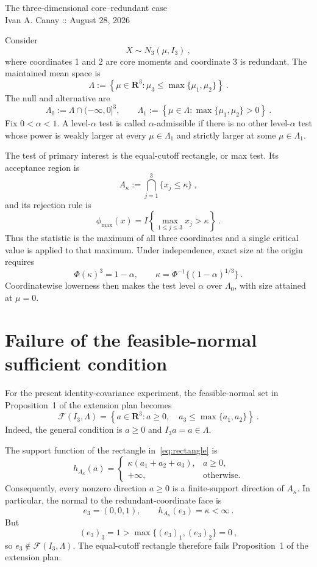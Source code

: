 \documentclass[12pt]{article}
\theoremstyle{remark}
\begin{document}
\begin{center}
{\Large The three-dimensional core--redundant case}\\[3pt]
{\small Ivan A. Canay :: August 28, 2026}
\end{center}

\medskip

Consider
\[
X\sim N_3(\mu,I_3)~,
\]
where coordinates 1 and 2 are core moments and coordinate 3 is redundant.  The
maintained mean space is
\[
\Lambda
:=
\left\{\mu\in\mathbf R^3:
\mu_3\le\max\{\mu_1,\mu_2\}
\right\}~.
\]
The null and alternative are
\[
\Lambda_0:=\Lambda\cap(-\infty,0]^3,
\qquad
\Lambda_1
:=
\left\{\mu\in\Lambda:
\max\{\mu_1,\mu_2\}>0
\right\}~.
\]
Fix $0<\alpha<1$.
A level-$\alpha$ test is called $\alpha$-admissible if there is no other
level-$\alpha$ test whose power is weakly larger at every
$\mu\in\Lambda_1$ and strictly larger at some $\mu\in\Lambda_1$.

The test of primary interest is the equal-cutoff rectangle, or max test.  Its
acceptance region is
\begin{equation}\label{eq:rectangle}
A_\kappa
:=
\bigcap_{j=1}^3\{x_j\le\kappa\}~,
\end{equation}
and its rejection rule is
\[
\phi_{\max}(x)
=
I\left\{\max_{1\le j\le3}x_j>\kappa\right\}~.
\]
Thus the statistic is the maximum of all three coordinates and a single
critical value is applied to that maximum.  Under independence, exact size at
the origin requires
\[
\Phi(\kappa)^3=1-\alpha,
\qquad
\kappa=\Phi^{-1}\{(1-\alpha)^{1/3}\}~.
\]
Coordinatewise lowerness then makes the test level $\alpha$ over
$\Lambda_0$, with size attained at $\mu=0$.

\section{Failure of the feasible-normal sufficient condition}

For the present identity-covariance experiment, the feasible-normal set in
Proposition~1 of the extension plan becomes
\begin{equation}\label{eq:feasible-set}
\mathcal F(I_3,\Lambda)
=
\left\{a\in\mathbf R^3:
a\ge0,\quad a_3\le\max\{a_1,a_2\}
\right\}~.
\end{equation}
Indeed, the general condition is $a\ge0$ and $I_3a=a\in\Lambda$.

The support function of the rectangle in~\eqref{eq:rectangle} is
\[
h_{A_\kappa}(a)
=
\begin{cases}
\kappa(a_1+a_2+a_3),&a\ge0,\\
+\infty,&\text{otherwise}.
\end{cases}
\]
Consequently, every nonzero direction $a\ge0$ is a finite-support direction
of $A_\kappa$.  In particular, the normal to the redundant-coordinate face is
\[
e_3=(0,0,1),
\qquad
h_{A_\kappa}(e_3)=\kappa<\infty~.
\]
But
\[
(e_3)_3=1
>
\max\{(e_3)_1,(e_3)_2\}=0~,
\]
so $e_3\notin\mathcal F(I_3,\Lambda)$.  The equal-cutoff rectangle therefore
fails Proposition~1 of the extension plan.
\end{document}
